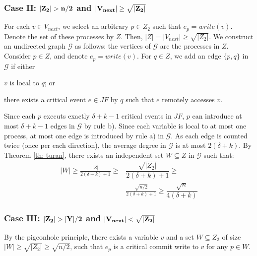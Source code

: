 \subsubsection*{\hspace{5mm} Case II: $\bf |Z_2| > n/2$ and $\bf |V_{next}| \geq \sqrt{|Z_2|}$}
For each $v \in V_{next}$, we select an arbitrary $p \in Z_2$ such that $e_p = write(v)$. Denote the set of these processes by $Z$. Then, $|Z|=|V_{next}| \geq \sqrt{|Z_2|}$.
\newline We construct an undirected graph $\mathcal{G}$ as follows: the vertices of $\mathcal{G}$ are the processes in $Z$. Consider $p \in Z$, and denote $e_p = write(v)$. For $q \in Z$, we add an edge $\{p,q\}$ in $\mathcal{G}$ if either
\begin{inparaenum}
	\item $v$ is local to $q$; or
	\item there exists a critical event $e \in J F$ by $q$ such that $e$ remotely accesses $v$.
\end{inparaenum}
\newline Since each $p$ executs exactly $\delta+k-1$ critical events in $J F$, $p$ can introduce at most $\delta+k-1$ edges in $\mathcal{G}$ by rule b). Since each variable is local to at most one process, at most one edge is introduced by rule a) in $\mathcal{G}$. As each edge is counted twice (once per each direction), the average degree in $\mathcal{G}$ is at most $2(\delta+k)$. By Theorem \ref{th: turan}, there exists an independent set $W \subseteq Z$ in $\mathcal{G}$ such that:
\begin{align*}
|W| \geq \frac{|Z|}{2(\delta+k)+1} \geq & \dfrac{\sqrt{|Z_2|}}{2(\delta+k)+1} \geq \\
& \frac{\sqrt{n/2}}{2(\delta+k)+1} \geq \dfrac{\sqrt{n}}{4(\delta+k)}
\end{align*}

\subsubsection*{\hspace{5mm} Case III: $\bf |Z_2| > |Y|/2$ and $\bf |V_{next}| < \sqrt{|Z_2|}$}
By the pigeonhole principle, there exists a variable $v$ and a set $W \subseteq Z_2$ of size $|W| \geq \sqrt{|Z_2|} \geq \sqrt{n/2}$, such that $e_p$ is a critical commit write to $v$ for any $p \in W$.

